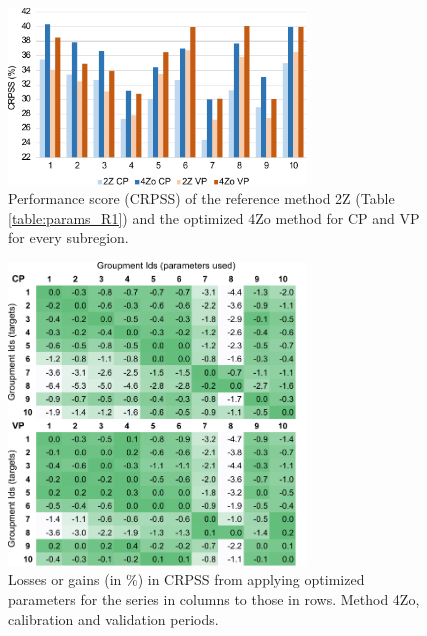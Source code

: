 \documentclass[review]{elsarticle}
\begin{document}
\begin{figure}[t]
	\centerline{\includegraphics[width=7.9cm]{fig04.pdf}}
	\caption{Performance score (CRPSS) of the reference method 2Z (Table \ref{table:params_R1}) and the optimized 4Zo method for CP and VP for every subregion.}
	\label{fig:figure_crpss_4Zo}
\end{figure}

\begin{figure}[t]
	\centerline{\includegraphics[width=7.9cm]{fig05.pdf}}
	\caption{Losses or gains (in \%) in CRPSS from applying optimized parameters for the series in columns to those in rows. Method 4Zo, calibration and validation periods.}
	\label{fig:crossing_4Zo}
\end{figure}
\end{document}
